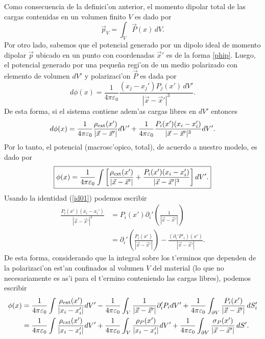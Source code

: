 Como consecuencia de la definici'on anterior, el momento dipolar
total de las cargas contenidas en un volumen finito $V$ es dado por
\begin{equation}\label{pintPdV}
 \vec{p}_V=\int_V \vec{P}(x)\,dV.
\end{equation}
Por otro lado, sabemos que el potencial generado por un dipolo ideal de momento dipolar $\vec{p}$ ubicado en un punto con coordenadas $\vec{x}'$ es de la forma \eqref{phip}. Luego, el potencial generado por una peque\~na regi'on de un medio polarizado con elemento de volumen $dV'$ y polarizaci'on $\vec{P}$ es dada por
\begin{equation}
d\phi(x)=\frac{1}{4\pi\varepsilon_0}\frac{(x_j-x_j')P_j(x')\,dV'}{|\vec{x}-\vec{
x}'|^3}.
\end{equation}
De esta forma, si el sistema contiene adem'as cargas libres en $dV'$ entonces
\begin{equation}
d\phi(x)=\frac{1}{4\pi\varepsilon_0}\frac{\rho_{\rm
ext}(x')}{|\vec{x}-\vec{x}'|}dV'+\frac {1}{
4\pi\varepsilon_0}\frac{P_i(x')(x_i-x_i')}{|\vec{x}-\vec{x}'|^3}dV'.
\end{equation}
Por lo tanto, el potencial (macrosc'opico, total), de acuerdo a nuestro modelo, es dado por
\begin{equation}
\boxed{\phi(x)=\frac{1}{4\pi\varepsilon_0}\int\left[\frac{\rho_{\rm
ext}(x')}{|\vec{x}-\vec{x}'|}+\frac{P_i(x')(x_i-x_i')}{|\vec{x}-\vec{x}'|^3}\right]dV'.}
\end{equation}
Usando la identidad (\ref{id01}) podemos escribir
\begin{align}
\frac{P_i(x')(x_i-x_i')}{|\vec{x}-\vec{x}'|^3}  &
=P_i(x')\partial_i'\left(  \frac{1}{|\vec{x}-\vec{x}'|}\right)\\
&=\partial_i'\left(\frac{P_i(x')}{|\vec{x}-\vec{x}'|}\right)-\frac{
(\partial_i'P'_i)(x')} {|\vec{x}-\vec{ x}'|}.
\end{align}
De esta forma, considerando que la integral sobre los t'erminos que dependen de la polarizaci'on est'an confinados al volumen $V$ del material (lo que no necesariamente es as'i para el t'ermino conteniendo las cargas libres), podemos escribir
\begin{align}
\phi(x)& =\frac{1}{4\pi\varepsilon_0}\int\frac{\rho_{\rm ext}(x')}{|x_i-x_i'|}dV'-\frac{1}{4\pi\varepsilon_0}\int_V\frac{1}%
{|\vec{x}-\vec{x}'|}\partial_i'P_idV'+\frac{1}{4\pi\varepsilon_0}\int_{
\partial V}\frac{P_i(x')}{|\vec{x}-\vec{x}'|}\,dS'_i \\
& =\frac{1}{4\pi\varepsilon_0}\int\frac{\rho_{\rm ext}(x')}{|x_i-x_i'|}dV'+\frac{1}{4\pi\varepsilon_0}\int_V\frac{\rho_P(x')}{|x_i-x_i'|}dV'+\frac{1}{4\pi\varepsilon_0}\int_{
\partial V}\frac{\sigma_P(x')}{|\vec{x}-\vec{x}'|}\,dS' .
\end{align}
